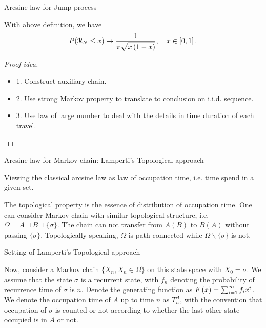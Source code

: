 \documentclass{beamer}
\begin{document}
\begin{frame}{Arcsine law for Jump process}
\par

\begin{Thm}
    With above definition, we have
    \begin{equation}
P(\mathcal{R}_N \leq x) \rightarrow  \frac{1}{\pi\sqrt{x\left( 1 - x \right)}}, \quad x \in \left[ 0, 1 \right].
\end{equation}
\end{Thm}
\begin{proof}[Proof idea]\renewcommand{\qedsymbol}{}
    \begin{itemize}
    	\item 1. Construct auxiliary chain.
	\item 2. Use strong Markov property to translate to conclusion on i.i.d. sequence.
	\item 3. Use law of large number to deal with the details in time duration of each travel.
    \end{itemize}
\end{proof}

\end{frame}


\begin{frame}{Arcsine law for Markov chain: Lamperti's Topological approach}
\par
Viewing the classical arcsine law as law of occupation time, i.e. time spend in a given set.
\par
The topological property is the essence of distribution of occupation time. One can consider Markov chain with similar topological structure, i.e. $\Omega = A \sqcup B \sqcup \{ \sigma \}$. The chain can not transfer from $A(B)$ to $B(A)$ without passing $\{ \sigma \}$. Topologically speaking, $\Omega$ is path-connected while $\Omega \backslash \{ \sigma \}$ is not.
\end{frame}


\begin{frame}{Setting of Lamperti's Topological approach}
\par
Now, consider a Markov chain $\{X_n, X_n \in \Omega \}$ on this state space with $X_0 = \sigma$. We assume that the state $\sigma$ is a recurrent state, with $f_n$ denoting the probability of recurrence time of $\sigma$ is $n$. Denote the generating function as $F\left( x \right) = \sum_{i = 1}^{\infty} f_i x^i$. We denote the occupation time of $A$ up to time $n$ as $T_n^{A}$, with the convention that occupation of $\sigma$ is counted or not according to whether the last other state occupied is in $A$ or not. 
\end{frame}
\end{document}
